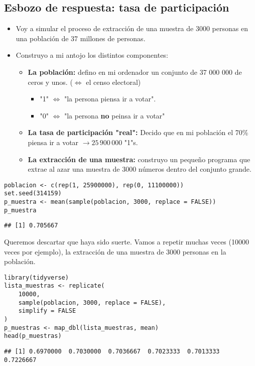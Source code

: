 \subsection{Esbozo de respuesta: tasa de participación}
\begin{tcolorbox}[colback=blue!5!white, colframe=blue!75!black, title=\textbf{Para convenceros, un experimento de simulación}]
\begin{itemize}[label=\textbullet]
    \item Voy a simular el proceso de extracción de una muestra de 3000 personas en una población de 37 millones de personas.
    \item Construyo a mi antojo los distintos componentes:
        \begin{itemize}[label=\textrightarrow]
            \item \textbf{La población:} defino en mi ordenador un conjunto de 37 000 000 de ceros y unos. ($\Leftrightarrow$ el censo electoral)
                \begin{itemize}[label=\textbullet]
                    \item "1" $\Leftrightarrow$ "la persona piensa ir a votar".
                    \item "0" $\Leftrightarrow$ "la persona \textbf{no} peinsa ir a votar"
                \end{itemize}
            \item \textbf{La tasa de participación "real":} Decido que en mi población el 70\% piensa ir a votar $\to 25\,900\,000$ "1"s.
            \item \textbf{La extracción de una muestra:} construyo un pequeño programa que extrae al azar una muestra de 3000 números dentro del conjunto grande. 
        \end{itemize}
\end{itemize}
\end{tcolorbox}
\begin{lstlisting}
poblacion <- c(rep(1, 25900000), rep(0, 11100000))
set.seed(314159)
p_muestra <- mean(sample(poblacion, 3000, replace = FALSE))
p_muestra   
\end{lstlisting}
\begin{verbatim}
## [1] 0.705667    
\end{verbatim}

Queremos descartar que haya sido suerte. Vamos a repetir muchas veces (10000 veces por ejemplo), la extracción de una muestra de 3000 personas en la población.
\begin{lstlisting}
library(tidyverse)
lista_muestras <- replicate(
    10000,
    sample(poblacion, 3000, replace = FALSE),
    simplify = FALSE
)
p_muestras <- map_dbl(lista_muestras, mean)
head(p_muestras)
\end{lstlisting}
\begin{verbatim}
## [1] 0.6970000  0.7030000  0.7036667  0.7023333  0.7013333  0.7226667
\end{verbatim}

